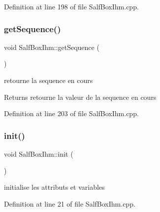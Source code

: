 Definition at line 198 of file Salf\+Box\+Ihm.\+cpp.

\mbox{\label{class_salf_box_ihm_accd0e647513951730e0465874a8384ea}} 
\subsubsection{\texorpdfstring{get\+Sequence()}{getSequence()}}
{\footnotesize\ttfamily void Salf\+Box\+Ihm\+::get\+Sequence (\begin{DoxyParamCaption}{ }\end{DoxyParamCaption})\hspace{0.3cm}{\ttfamily [static]}}



retourne la sequence en cours 

\begin{DoxyReturn}{Returns}
retourne la valeur de la sequence en cours 
\end{DoxyReturn}


Definition at line 203 of file Salf\+Box\+Ihm.\+cpp.

\mbox{\label{class_salf_box_ihm_a0d0f3f0595146757c529e06e3006ac50}} 
\subsubsection{\texorpdfstring{init()}{init()}}
{\footnotesize\ttfamily void Salf\+Box\+Ihm\+::init (\begin{DoxyParamCaption}{ }\end{DoxyParamCaption})\hspace{0.3cm}{\ttfamily [static]}}



initialise les attributs et variables 



Definition at line 21 of file Salf\+Box\+Ihm.\+cpp.

\mbox{\label{class_salf_box_ihm_a540d7a30e9dbdea8c9ec4542543e9a00}} 

